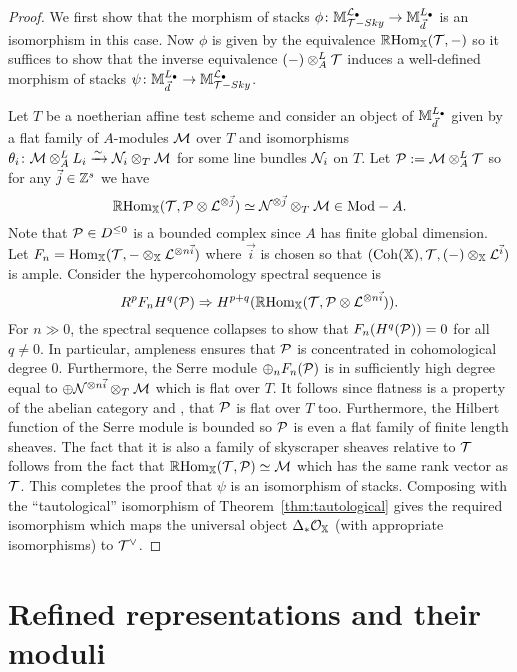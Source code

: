 \documentclass[12pt]{amsart}
\begin{document}
\begin{proof}
We first show that the morphism of stacks $\phi \colon \mathbb{M}_{\mathcal{T}-Sky}^{\mathcal{L}_{\bullet}} \to \mathbb{M}_{\vec{d}}^{L_{\bullet}}$ is an isomorphism in this case. Now $\phi$ is given by the equivalence $\mathop{\mathbb{R}\mathrm{Hom}}\nolimits_{\mathbb{X}}(\mathcal{T}, -)$ so it suffices to show that the inverse equivalence $(-) \otimes^L_A \mathcal{T}$ induces a well-defined morphism of stacks $\psi \colon \mathbb{M}_{\vec{d}}^{L_{\bullet}} \to \mathbb{M}_{\mathcal{T}-Sky}^{\mathcal{L}_{\bullet}}$. 

Let $T$ be a noetherian affine test scheme and consider an object of $\mathbb{M}_{\vec{d}}^{L_{\bullet}}$ given by a flat family of $A$-modules $\mathcal{M}$ over $T$ and isomorphisms $\theta_i \colon \mathcal{M} \otimes_A^L L_i \xrightarrow{\sim} \mathcal{N}_i \otimes_T \mathcal{M}$ for some line bundles $\mathcal{N}_i$ on $T$. Let $\mathcal{P} := \mathcal{M} \otimes_A^L \mathcal{T}$ so for any $\vec{j} \in \mathbb{Z}^s$ we have
$$\mathop{\mathbb{R}\mathrm{Hom}}\nolimits_{\mathbb{X}}(\mathcal{T}, \mathcal{P} \otimes \mathcal{L}^{\otimes \vec{j}}) \simeq \mathcal{N}^{\otimes \vec{j}} \otimes_T \mathcal{M} \in \textup{Mod}-A.$$
Note that $\mathcal{P} \in D^{\leq 0}$ is a bounded complex since $A$ has finite global dimension. Let $F_n = \operatorname{Hom}_{\mathbb{X}}(\mathcal{T}, - \otimes_{\mathbb{X}} \mathcal{L}^{\otimes n \vec{i}})$ where $\vec{i}$ is chosen so that $(\operatorname{Coh}(\mathbb{X}), \mathcal{T}, (-)\otimes_{\mathbb{X}} \mathcal{L}^{\vec{i}})$ is ample. Consider the hypercohomology spectral sequence is 
$$ R^pF_n H^q(\mathcal{P}) \Rightarrow H^{p+q}(\mathop{\mathbb{R}\mathrm{Hom}}\nolimits_{\mathbb{X}}(\mathcal{T}, \mathcal{P} \otimes \mathcal{L}^{\otimes n\vec{i}})).$$
For $n\gg 0$, the spectral sequence collapses to show that $F_n(H^q(\mathcal{P})) = 0$ for all $q \neq 0$. In particular, ampleness ensures that $\mathcal{P}$ is concentrated in cohomological degree 0. Furthermore, the Serre module $\oplus_n F_n(\mathcal{P})$ is in sufficiently high degree equal to 
$\oplus \mathcal{N}^{\otimes n \vec{i}} \otimes_T \mathcal{M}$ which is flat over $T$. It follows since flatness is a property of the abelian category and \cite{AZ94}, that $\mathcal{P}$ is flat over $T$ too. Furthermore, the Hilbert function of the Serre module is bounded so $\mathcal{P}$ is even a flat family of finite length sheaves. The fact that it is also a family of skyscraper sheaves relative to $\mathcal{T}$ follows from the fact that $\mathop{\mathbb{R}\mathrm{Hom}}\nolimits_{\mathbb{X}}(\mathcal{T}, \mathcal{P}) \simeq \mathcal{M}$ which has the same rank vector as $\mathcal{T}$. This completes the proof that $\psi$ is an isomorphism of stacks. Composing with the ``tautological'' isomorphism of Theorem~\ref{thm:tautological} gives the required isomorphism which maps the universal object $\Delta_{*}\mathcal{O}_{\mathbb{X}}$ (with appropriate isomorphisms) to $\mathcal{T}^{\vee}$. 
\end{proof}

\section{Refined representations and their moduli}
\end{document}
